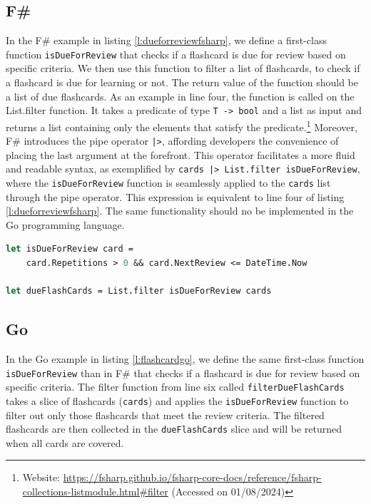     \subsection*{F\#}
    In the F\# example in listing \ref{l:dueforreviewfsharp}, we define a first-class function \texttt{isDueForReview} that checks if a flashcard is due for review based on specific criteria. We then use this function to filter a list of flashcards, to check if a flashcard is due for learning or not. The return value of the function should be a list of due flashcards. As an example in line four, the function is called on the List.filter function. It takes a predicate of type \texttt{T -> bool} and a list as input and returns a list containing only the elements that satisfy the predicate.\footnote{Website: \url{https://fsharp.github.io/fsharp-core-docs/reference/fsharp-collections-listmodule.html\#filter} (Accessed on 01/08/2024)} Moreover, F\# introduces the pipe operator \texttt{|>}, affording developers the convenience of placing the last argument at the forefront. This operator facilitates a more fluid and readable syntax, as exemplified by \texttt{cards |> List.filter isDueForReview}, where the \texttt{isDueForReview} function is seamlessly applied to the \texttt{cards} list through the pipe operator. This expression is equivalent to line four of listing \ref{l:dueforreviewfsharp}. The same functionality should no be implemented in the Go programming language.

\begin{lstlisting}[language=fsharp, firstnumber=1,float=tp, caption={First-class function reresentation in F\#}, label=l:dueforreviewfsharp]
let isDueForReview card =
    card.Repetitions > 0 && card.NextReview <= DateTime.Now
        
let dueFlashCards = List.filter isDueForReview cards
\end{lstlisting}
        
    \subsection*{Go}
    In the Go example in listing \ref{l:flashcardgo}, we define the same first-class function \texttt{isDueForReview} than in F\# that checks if a flashcard is due for review based on specific criteria. The filter function from line six called \texttt{filterDueFlashCards} takes a slice of flashcards (\texttt{cards}) and applies the \texttt{isDueForReview} function to filter out only those flashcards that meet the review criteria. The filtered flashcards are then collected in the \texttt{dueFlashCards} slice and will be returned when all cards are covered.
    
